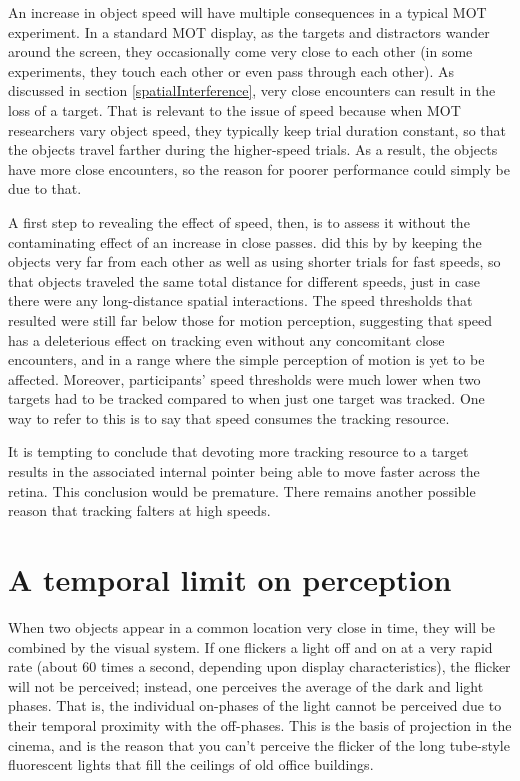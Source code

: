 \documentclass[
]{book}
\begin{document}
An increase in object speed will have multiple consequences in a typical MOT experiment. In a standard MOT display, as the targets and distractors wander around the screen, they occasionally come very close to each other (in some experiments, they touch each other or even pass through each other). As discussed in section \ref{spatialInterference}, very close encounters can result in the loss of a target. That is relevant to the issue of speed because when MOT researchers vary object speed, they typically keep trial duration constant, so that the objects travel farther during the higher-speed trials. As a result, the objects have more close encounters, so the reason for poorer performance could simply be due to that.

A first step to revealing the effect of speed, then, is to assess it without the contaminating effect of an increase in close passes. \citet{holcombeExhaustingAttentionalTracking2012} did this by by keeping the objects very far from each other as well as
using shorter trials for fast speeds, so that objects traveled the same total distance for different speeds, just in case there were any long-distance spatial interactions. The speed thresholds that resulted were still far below those for motion perception, suggesting that speed has a deleterious effect on tracking even without any concomitant close encounters, and in a range where the simple perception of motion is yet to be affected. Moreover, participants' speed thresholds were much lower when two targets had to be tracked compared to when just one target was tracked. One way to refer to this is to say that speed consumes the tracking resource.

It is tempting to conclude that devoting more tracking resource to a target results in the associated internal pointer being able to move faster across the retina. This conclusion would be premature. There remains another possible reason that tracking falters at high speeds.

\hypertarget{a-temporal-limit-on-perception}{%
\section{A temporal limit on perception}\label{a-temporal-limit-on-perception}}

When two objects appear in a common location very close in time, they will be combined by the visual system. If one flickers a light off and on at a very rapid rate (about 60 times a second, depending upon display characteristics), the flicker will not be perceived; instead, one perceives the average of the dark and light phases. That is, the individual on-phases of the light cannot be perceived due to their temporal proximity with the off-phases. This is the basis of projection in the cinema, and is the reason that you can't perceive the flicker of the long tube-style fluorescent lights that fill the ceilings of old office buildings.
\end{document}
